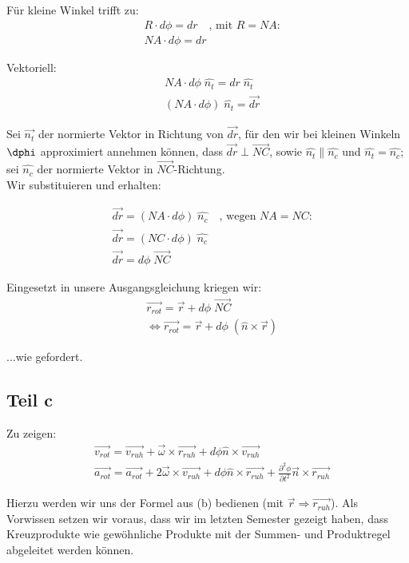 \documentclass[a4paper,german,12pt,smallheadings]{scrartcl}
\begin{document}
Für kleine Winkel trifft zu:
\begin{align*}
& R\cdot {d\phi}=dr \quad \text{, mit $R=NA$:}\\
& NA\cdot {d\phi}=dr
\end{align*}

Vektoriell:
\begin{align*}
& NA\cdot {d\phi} \; \hat{n_t}=dr \; \hat{n_t}\\
& (NA\cdot {d\phi}) \; \hat{n_t}=\vec{dr}
\end{align*}

Sei $\vec{n_t}$ der normierte Vektor in Richtung von $\vec{dr}$, für den wir bei kleinen Winkeln $\dphi$ approximiert annehmen können, dass $\vec{dr}\perp\vec{NC}$, sowie $\hat{n_t}\parallel\hat{n_c}$ und $\hat{n_t}=\hat{n_c}$;\\
sei $\hat{n_c}$ der normierte Vektor in $\vec{NC}$-Richtung.\\
Wir substituieren und erhalten:

\begin{align*}
& \vec{dr}=\left(NA \cdot d\phi\right) \; \hat{n_c} \quad \text{, wegen $NA=NC$:}\\
& \vec{dr}=\left(NC \cdot d\phi\right) \; \hat{n_c}\\
& \vec{dr}=d\phi \; \vec{NC}
\end{align*}

Eingesetzt in unsere Ausgangsgleichung kriegen wir:
\begin{align*}
& \vec{r_{rot}}=\vec{r}+d\phi \; \vec{NC}\\
& \Leftrightarrow \vec{r_{rot}}=\vec{r}+d\phi \; (\hat{n} \times \vec{r})
\end{align*}

...wie gefordert.

\subsection*{Teil c}

Zu zeigen:
\begin{align*}
& \vec{v_{rot}}=\vec{v_{ruh}}+\vec{\omega} \times \vec{r_{ruh}}+d\phi\hat{n} \times \vec{v_{ruh}}\\
& \vec{a_{rot}}=\vec{a_{rot}}+2\vec{\omega} \times \vec{v_{ruh}}+d\phi \hat{n} \times \vec{r_{ruh}}+\frac{\partial^2 \phi}{\partial t^2}\vec{n} \times \vec{r_{ruh}}
\end{align*}

Hierzu werden wir uns der Formel aus (b) bedienen (mit $\vec{r}\Rightarrow\vec{r_{ruh}}$). Als Vorwissen setzen wir voraus, dass wir im letzten Semester gezeigt haben, dass Kreuzprodukte wie gewöhnliche Produkte mit der Summen- und Produktregel abgeleitet werden können.\\
\end{document}
